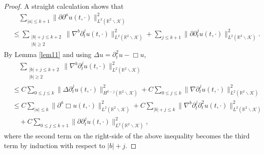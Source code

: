 \documentclass[11pt, reqno]{amsart}
\theoremstyle{definition}
\theoremstyle{remark}
\theoremstyle{definition}
\numberwithin{equation}{section}
\numberwithin{equation}{section}
\def\leq{\leqslant}
\def\geq{\geqslant}
\begin{document}
\begin{proof}
A straight calculation shows that
\begin{align*}
&\quad\sum_{|a|\leq k+1}\|\partial\partial^au(t,\cdot)\|^2_{L^2(\mathbb
R^2\backslash\mathcal {K})}
\\&\leq  \sum_{\substack{|b|+j\leq k+2\\|b|\geq2}}\|\nabla^b\partial_t^ju(t,\cdot)\|^2_{L^2(\mathbb
R^2\backslash\mathcal {K})}+\sum_{j\leq k+1}\|\partial\partial_t^ju(t,\cdot)\|^2_{L^2(\mathbb
R^2\backslash\mathcal {K})}.
\end{align*}
By Lemma \ref{lem11} and using $\Delta u=\partial_t^2u-\Box u$,
\begin{align*}
&\quad\sum_{\substack{|b|+j\leq k+2\\|b|\geq2}}\|\nabla^b\partial_t^ju(t,\cdot)\|^2_{L^2(\mathbb
R^2\backslash\mathcal {K})}
\\&\leq C\sum_{0\leq j\leq k}\|\Delta\partial_t^ju(t,\cdot)\|^2_{H^{k-j}(\mathbb
R^2\backslash\mathcal {K})}+C\sum_{0\leq j\leq k}\|\nabla\partial_t^ju(t,\cdot)\|^2_{L^2(\mathbb
R^2\backslash\mathcal {K})}
\\&\leq C\sum_{|a|\leq k}\|\partial^a\Box
u(t,\cdot)\|^2_{L^2(\mathbb R^2\backslash\mathcal {K})}+C\sum_{|b|+j\leq k}\|\nabla^b\partial_t^{j}\partial_t^2u(t,\cdot)\|^2_{L^2(\mathbb
R^2\backslash\mathcal {K})}
\\&\quad+C\sum_{0\leq j\leq k+1}\|\partial\partial_t^ju(t,\cdot)\|^2_{L^2(\mathbb
R^2\backslash\mathcal {K})},
\end{align*}
where the second term on the right-side of the above inequality becomes the third term by induction with respect to $|b|+j$.
\end{proof}
\end{document}

